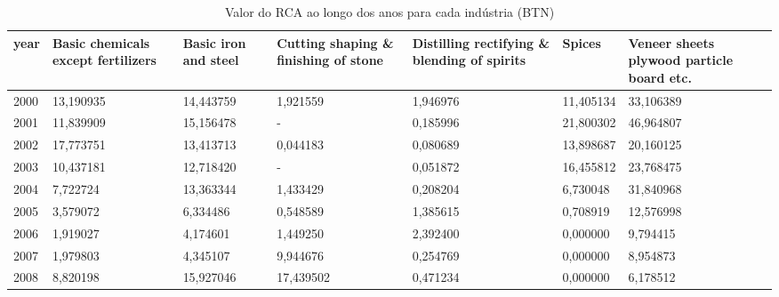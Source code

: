 \begin{table}
\centering
\caption{Valor do RCA ao longo dos anos para cada indústria (BTN)}
\begin{tabular}{p{1cm}p{2cm}p{2cm}p{2cm}p{2cm}p{2cm}p{2cm}}
\toprule
 year &  Basic chemicals except fertilizers &  Basic iron and steel &  Cutting shaping \& finishing of stone &  Distilling rectifying \& blending of spirits &     Spices &  Veneer sheets plywood particle board etc. \\
\midrule
 2000 &                           13,190935 &             14,443759 &                              1,921559 &                                     1,946976 &  11,405134 &                                  33,106389 \\
 2001 &                           11,839909 &             15,156478 &                                     - &                                     0,185996 &  21,800302 &                                  46,964807 \\
 2002 &                           17,773751 &             13,413713 &                              0,044183 &                                     0,080689 &  13,898687 &                                  20,160125 \\
 2003 &                           10,437181 &             12,718420 &                                     - &                                     0,051872 &  16,455812 &                                  23,768475 \\
 2004 &                            7,722724 &             13,363344 &                              1,433429 &                                     0,208204 &   6,730048 &                                  31,840968 \\
 2005 &                            3,579072 &              6,334486 &                              0,548589 &                                     1,385615 &   0,708919 &                                  12,576998 \\
 2006 &                            1,919027 &              4,174601 &                              1,449250 &                                     2,392400 &   0,000000 &                                   9,794415 \\
 2007 &                            1,979803 &              4,345107 &                              9,944676 &                                     0,254769 &   0,000000 &                                   8,954873 \\
 2008 &                            8,820198 &             15,927046 &                             17,439502 &                                     0,471234 &   0,000000 &                                   6,178512 \\

\end{tabular}
\end{table}
